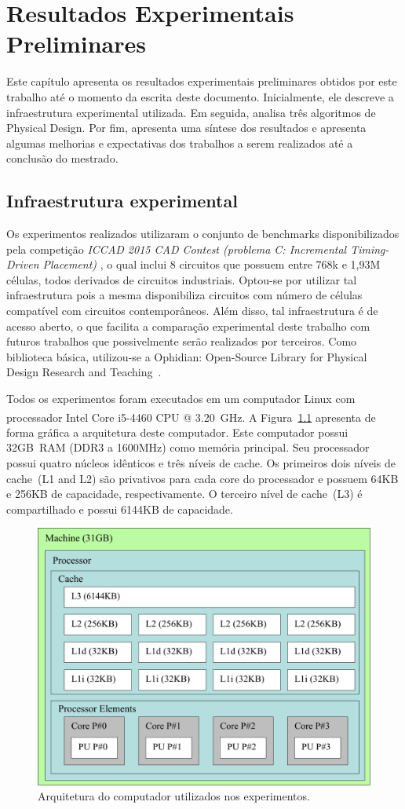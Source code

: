 \chapter{Resultados Experimentais Preliminares}
\label{cap:resultados}

Este capítulo apresenta os resultados experimentais preliminares obtidos por este trabalho até o momento da escrita deste documento. Inicialmente, ele descreve a infraestrutura experimental utilizada. Em seguida, analisa três algoritmos de Physical Design. Por fim, apresenta uma síntese dos resultados e apresenta algumas melhorias e expectativas dos trabalhos a serem realizados até  a conclusão do mestrado.

\section{Infraestrutura experimental}
\label{sec:infraestrutura_experimental}

Os experimentos realizados utilizaram o conjunto de benchmarks disponibilizados pela competição \textit{ICCAD 2015 CAD Contest (problema C: Incremental Timing-Driven Placement)} \cite{kim2015}, o qual inclui 8 circuitos que possuem entre 768k e 1,93M células, todos derivados de circuitos industriais. Optou-se por utilizar tal infraestrutura pois a mesma disponibiliza circuitos com número de células compatível com circuitos contemporâneos. Além disso, tal infraestrutura é de acesso aberto, o que facilita a comparação experimental deste trabalho com futuros trabalhos que possivelmente serão realizados por terceiros. Como biblioteca básica, utilizou-se a Ophidian: Open-Source Library for Physical Design Research and Teaching~\cite{ophidian}.

Todos os experimentos foram executados em um computador Linux com processador Intel\textsuperscript{\textregistered} Core\textsuperscript{\textregistered} i5-4460 CPU @ 3.20~GHz.
A Figura~\ref{fig:architectureMemoryZeus} apresenta de forma gráfica a arquitetura deste computador.
Este computador possui 32GB~RAM (DDR3 a 1600MHz) como memória principal.
Seu processador possui quatro núcleos idênticos e três níveis de cache.
Os primeiros dois níveis de cache~(L1 and L2) são privativos para cada core do processador e possuem 64KB e 256KB de capacidade, respectivamente.
O terceiro nível de cache~(L3) é compartilhado e possui 6144KB de capacidade.

\begin{figure}[ht]
    \centering
    \includegraphics[width=0.5\linewidth]{img/results/architectureMemoryZeus.pdf}
    \caption{Arquitetura do computador utilizados nos experimentos.}
    \label{fig:architectureMemoryZeus}
\end{figure}

